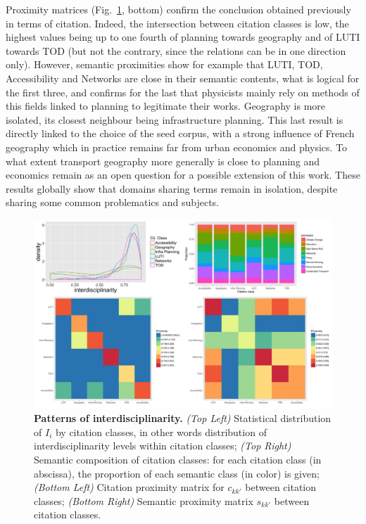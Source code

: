 \documentclass[10pt]{article}
\begin{document}
Proximity matrices (Fig.~\ref{fig:interdisc}, bottom) confirm the conclusion obtained previously in terms of citation. Indeed, the intersection between citation classes is low, the highest values being up to one fourth of planning towards geography and of LUTI towards TOD (but not the contrary, since the relations can be in one direction only). However, semantic proximities show for example that LUTI, TOD, Accessibility and Networks are close in their semantic contents, what is logical for the first three, and confirms for the last that physicists mainly rely on methods of this fields linked to planning to legitimate their works. Geography is more isolated, its closest neighbour being infrastructure planning. This last result is directly linked to the choice of the seed corpus, with a strong influence of French geography which in practice remains far from urban economics and physics. To what extent transport geography more generally is close to planning and economics remain as an open question for a possible extension of this work. These results globally show that domains sharing terms remain in isolation, despite sharing some common problematics and subjects.


\begin{figure}
\includegraphics[width=\linewidth]{2-2-2-fig-quantepistemo-interdisc.jpg}
\caption{\textbf{Patterns of interdisciplinarity.} \textit{(Top Left)} Statistical distribution of $I_i$ by citation classes, in other words distribution of interdisciplinarity levels within citation classes; \textit{(Top Right)} Semantic composition of citation classes: for each citation class (in abscissa), the proportion of each semantic class (in color) is given; \textit{(Bottom Left)} Citation proximity matrix for $c_{kk'}$ between citation classes; \textit{(Bottom Right)} Semantic proximity matrix $s_{kk'}$ between citation classes. \label{fig:interdisc}}
\end{figure}
\end{document}
